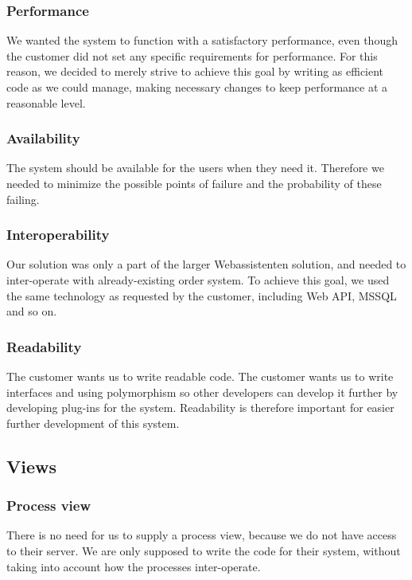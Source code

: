 \subsubsection{Performance}
We wanted the system to function with a satisfactory performance, even though the customer did not set any specific requirements for performance. For this reason, we decided to merely strive to achieve this goal by writing as efficient code as we could manage, making necessary changes to keep performance at a reasonable level. %

\subsubsection{Availability}
The system should be available for the users when they need it. Therefore we needed to minimize the possible points of failure and the probability of these failing. %

\subsubsection{Interoperability}
Our solution was only a part of the larger Webassistenten solution, and needed to inter-operate with already-existing order system. To achieve this goal, we used the same technology as requested by the customer, including Web API, MSSQL and so on.

\subsubsection{Readability}
The customer wants us to write readable code. The customer wants us to write interfaces and using polymorphism so other developers can develop it further by developing plug-ins for the system. Readability is therefore important for easier further development of this system.


\subsection{Views}

\subsubsection{Process view}
There is no need for us to supply a process view, because we do not have access to their server. We are only supposed to write the code for their system, without taking into account how the processes inter-operate.
